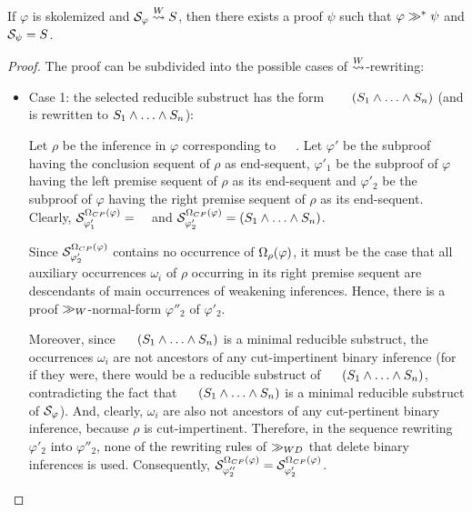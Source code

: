 \documentclass{llncs}
\begin{document}
\begin{lemma}
\label{lemma:SwapNormalizeCorrespondence}
If $\varphi$ is skolemized and $\mathcal{S}_{\varphi} \stackrel{W}{\leadsto} S$, then there exists a proof $\psi$ such that $\varphi \gg^* \psi$ and $\mathcal{S}_{\psi} = S$. 
\end{lemma}
\begin{proof}

The proof can be subdivided into the possible cases of $\stackrel{W}{\leadsto}$-rewriting:

\begin{itemize}
	\item Case 1: the selected reducible substruct has the form $\hF{S} \hF{\structtimes_{\rho}} (S_1 \structplus \ldots \structplus S_n)$ (and is rewritten to $S_1 \wedge \ldots \wedge S_n$):

Let $\rho$ be the inference in $\varphi$ corresponding to $\hF{\structtimes_{\rho}}$. Let $\varphi'$ be the subproof having the conclusion sequent of $\rho$ as end-sequent, $\varphi'_1$ be the subproof of $\varphi$ having the left premise sequent of $\rho$ as its end-sequent and $\varphi'_2$ be the subproof of $\varphi$ having the right premise sequent of $\rho$ as its end-sequent. Clearly, $\pertstruct{\varphi'_1}{\occCutPert{\varphi}} = \hF{S}$ and $\mathcal{S}_{\varphi'_2}^{\Omega_{CP}(\varphi)} = (S_1 \wedge \ldots \wedge S_n)$. 

Since $\mathcal{S}_{\varphi'_2}^{\Omega_{CP}(\varphi)}$ contains no occurrence of $\Omega_{\rho}(\varphi)$, it must be the case that all auxiliary occurrences $\omega_i$ of $\rho$ occurring in its right premise sequent are descendants of main occurrences of weakening inferences. Hence, there is a proof $\gg_{W}$-normal-form $\varphi''_2$ of $\varphi'_2$. 

Moreover, since $\hF{S} \hF{\structtimes} (S_1 \structplus \ldots \structplus S_n)$ is a minimal reducible substruct, the occurrences $\omega_i$ are not ancestors of any cut-impertinent binary inference (for if they were, there would be a reducible substruct of $\hF{S} \hF{\structtimes} (S_1 \structplus \ldots \structplus S_n)$, contradicting the fact that $\hF{S} \hF{\structtimes} (S_1 \structplus \ldots \structplus S_n)$ is a minimal reducible substruct of $\mathcal{S}_{\varphi}$). And, clearly, $\omega_i$ are also not ancestors of any cut-pertinent binary inference, because $\rho$ is cut-impertinent. Therefore, in the sequence rewriting $\varphi'_2$ into $\varphi''_2$, none of the rewriting rules of $\gg_{WD}$ that delete binary inferences is used. Consequently, $\mathcal{S}_{\varphi''_2}^{\Omega_{CP}(\varphi)} = \mathcal{S}_{\varphi'_2}^{\Omega_{CP}(\varphi)}$.


\end{itemize}
\end{proof}
\end{document}
